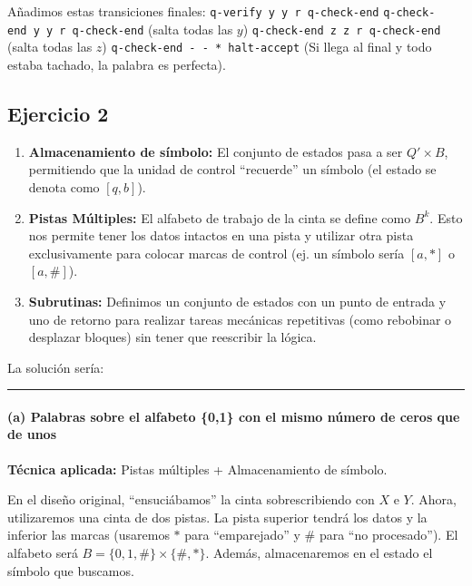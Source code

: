 \documentclass[12pt]{book} %
\providecommand{\tightlist}{%
  \setlength{\itemsep}{0pt}\setlength{\parskip}{0pt}}
\begin{document}
Añadimos estas transiciones finales:
\texttt{q-verify\ y\ y\ r\ q-check-end}
\texttt{q-check-end\ y\ y\ r\ q-check-end} (salta todas las \(y\))
\texttt{q-check-end\ z\ z\ r\ q-check-end} (salta todas las \(z\))
\texttt{q-check-end\ -\ -\ *\ halt-accept} (Si llega al final y todo
estaba tachado, la palabra es perfecta).

\hypertarget{ejercicio-2}{%
\subsection{Ejercicio 2}\label{ejercicio-2}}

\begin{enumerate}
\def\labelenumi{\arabic{enumi}.}
\tightlist
\item
  \textbf{Almacenamiento de símbolo:} El conjunto de estados pasa a ser
  \(Q' \times B\), permitiendo que la unidad de control ``recuerde'' un
  símbolo (el estado se denota como \([q, b]\)).
\item
  \textbf{Pistas Múltiples:} El alfabeto de trabajo de la cinta se
  define como \(B^k\). Esto nos permite tener los datos intactos en una
  pista y utilizar otra pista exclusivamente para colocar marcas de
  control (ej. un símbolo sería \([a, *]\) o \([a, \#]\)).
\item
  \textbf{Subrutinas:} Definimos un conjunto de estados con un punto de
  entrada y uno de retorno para realizar tareas mecánicas repetitivas
  (como rebobinar o desplazar bloques) sin tener que reescribir la
  lógica.
\end{enumerate}

La solución sería:

\begin{center}\rule{0.5\linewidth}{0.5pt}\end{center}

\hypertarget{a-palabras-sobre-el-alfabeto-01-con-el-mismo-nuxfamero-de-ceros-que-de-unos-1}{%
\paragraph{(a) Palabras sobre el alfabeto \{0,1\} con el mismo número de
ceros que de
unos}\label{a-palabras-sobre-el-alfabeto-01-con-el-mismo-nuxfamero-de-ceros-que-de-unos-1}}

\textbf{Técnica aplicada:} Pistas múltiples + Almacenamiento de símbolo.

En el diseño original, ``ensuciábamos'' la cinta sobrescribiendo con
\(X\) e \(Y\). Ahora, utilizaremos una cinta de dos pistas. La pista
superior tendrá los datos y la inferior las marcas (usaremos \(*\) para
``emparejado'' y \(\#\) para ``no procesado''). El alfabeto será
\(B = \{0, 1, \#\} \times \{\#, *\}\). Además, almacenaremos en el
estado el símbolo que buscamos.
\end{document}
